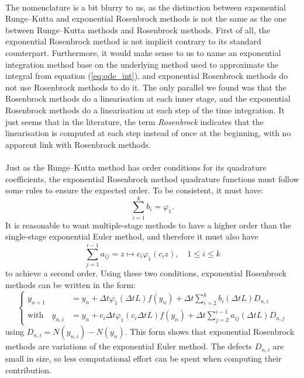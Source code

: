     \paragraph{}
    The nomenclature is a bit blurry to us, as the distinction between exponential Runge--Kutta and exponential Rosenbrock methods is not the same as the one between Runge--Kutta methods and Rosenbrock methods.
    First of all, the exponential Rosenbrock method is not implicit contrary to its standard counterpart.
    Furthermore, it would make sense to us to name an exponential integration method base on the underlying method used to approximate the integral from equation (\ref{eq:ode_int}), and exponential Rosenbrock methods do not use Rosenbrock methods to do it.
    The only parallel we found was that the Rosenbrock methods do a linearisation at each inner stage, and the exponential Rosenbrock methods do a linearisation at each step of the time integration.
    It just seems that in the literature, the term \emph{Rosenbrock} indicates that the linearisation is computed at each step instead of once at the beginning, with no apparent link with Rosenbrock methods.

    \paragraph{}
    Just as the Runge--Kutta method has order conditions for its quadrature coefficients, the exponential Rosenbrock method quadrature functions must follow some rules to ensure the expected order.
    To be consistent, it must have:
    \begin{equation}
      \sum_{i = 1}^k b_i = \varphi_1 .
    \end{equation}
    It is reasonable to want multiple-stage methods to have a higher order than the single-stage exponential Euler method, and therefore it must also have
    \begin{equation}
       \sum_{j = 1}^{i-1} a_{ij} = z \mapsto c_i \varphi_1\left(c_i z\right), \quad 1 \leq i \leq k
    \end{equation}
    to achieve a second order.
    Using these two conditions, exponential Rosenbrock methods can be written in the form:
    \begin{equation}\label{eq:exprb_defect}
      \left\{\begin{aligned}
        y_{n+1} &= y_n  + \Delta t \varphi_1\left(\Delta t L\right) f\left(y_n\right) + \Delta t \sum_{i = 2}^k b_i\left(\Delta t L\right) D_{n,i} \\
        \textrm{with}\quad y_{n,i} &= y_n  + c_i \Delta t \varphi_1\left(c_i \Delta t L\right) f\left(y_n\right) + \Delta t \sum_{j = 2}^{i-1} a_{ij}\left(\Delta t L\right) D_{n,j}
      \end{aligned}\right.
    \end{equation}
    using $D_{n,i} = N\left(y_{n,i}\right) - N\left(y_n\right)$.
    This form shows that exponential Rosenbrock methods are variations of the exponential Euler method.
    The defects $D_{n, i}$ are small in size, so less computational effort can be spent when computing their contribution.

